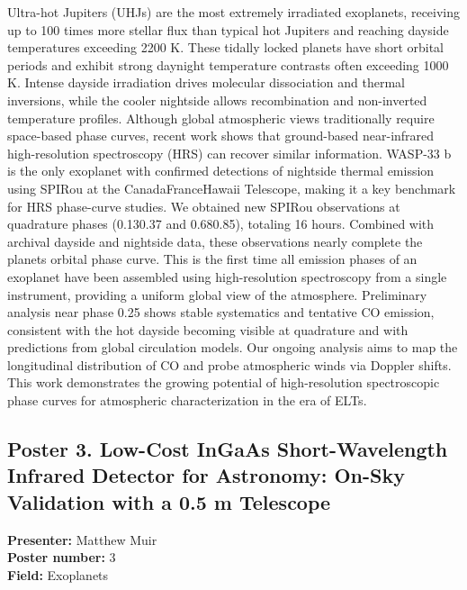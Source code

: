 Ultra-hot Jupiters (UHJs) are the most extremely irradiated exoplanets, receiving up to 100 times more stellar flux than typical hot Jupiters and reaching dayside temperatures exceeding 2200 K. These tidally locked planets have short orbital periods and exhibit strong daynight temperature contrasts often exceeding 1000 K. Intense dayside irradiation drives molecular dissociation and thermal inversions, while the cooler nightside allows recombination and non-inverted temperature profiles. Although global atmospheric views traditionally require space-based phase curves, recent work shows that ground-based near-infrared high-resolution spectroscopy (HRS) can recover similar information. WASP-33 b is the only exoplanet with confirmed detections of nightside thermal emission using SPIRou at the CanadaFranceHawaii Telescope, making it a key benchmark for HRS phase-curve studies. We obtained new SPIRou observations at quadrature phases (0.130.37 and 0.680.85), totaling 16 hours. Combined with archival dayside and nightside data, these observations nearly complete the planets orbital phase curve. This is the first time all emission phases of an exoplanet have been assembled using high-resolution spectroscopy from a single instrument, providing a uniform global view of the atmosphere. Preliminary analysis near phase 0.25 shows stable systematics and tentative CO emission, consistent with the hot dayside becoming visible at quadrature and with predictions from global circulation models. Our ongoing analysis aims to map the longitudinal distribution of CO and probe atmospheric winds via Doppler shifts. This work demonstrates the growing potential of high-resolution spectroscopic phase curves for atmospheric characterization in the era of ELTs.

\hypertarget{poster-abstract-talk-332}{}\label{poster-abstract-page-talk-332}
\subsection*{Poster 3. Low-Cost InGaAs Short-Wavelength Infrared Detector for Astronomy: On-Sky Validation with a 0.5 m Telescope}
\textbf{Presenter:} Matthew Muir\\
\textbf{Poster number:} 3\\
\textbf{Field:} Exoplanets

